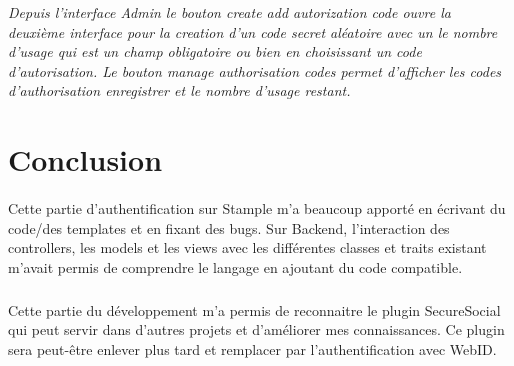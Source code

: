 \textit{Depuis l'interface Admin le bouton create add autorization code ouvre la deuxième interface pour la creation d'un code secret aléatoire avec un le nombre d'usage qui est un champ obligatoire ou bien en choisissant un code d'autorisation.
Le bouton manage authorisation codes permet d'afficher les codes d'authorisation enregistrer et le nombre d'usage restant.
}
\section{Conclusion}
\paragraph{}
Cette partie d'authentification sur Stample m'a beaucoup apporté en écrivant du code/des templates et en fixant des bugs.
Sur Backend, l'interaction des controllers, les models et les views avec les différentes classes et traits existant m'avait permis de comprendre le langage en ajoutant du code compatible.
\subparagraph{}
Cette partie du développement m'a permis de reconnaitre le plugin SecureSocial qui peut servir dans d'autres projets et d'améliorer mes connaissances. 
Ce plugin sera peut-être enlever plus tard et remplacer par l'authentification avec WebID. 
